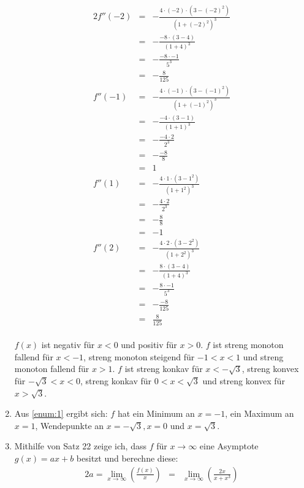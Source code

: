 \documentclass[10pt,a4paper,oneside,ngerman,numbers=noenddot]{scrartcl}
\begin{document}
\begin{enumerate}
	\begin{alignat*}{2}
	f''(-2) &=& -\frac{4 \cdot (-2) \cdot \left(3- (-2)^{2}\right)}{\left(1+ (-2)^{2} \right)^{3}} \\
	&=& -\frac{-8 \cdot \left(3- 4 \right)}{\left(1+ 4 \right)^{3}} \\
	&=& -\frac{-8 \cdot -1}{5^{3}} \\
	&=& -\frac{8}{125} \\
	f''(-1) &=& -\frac{4 \cdot (-1) \cdot \left(3- (-1)^{2}\right)}{\left(1+ (-1)^{2} \right)^{3}} \\
	&=& -\frac{-4 \cdot \left(3- 1\right)}{\left(1+ 1 \right)^{3}} \\
	&=& -\frac{-4 \cdot 2}{2^{3}} \\
	&=& -\frac{-8}{8} \\
	&=& 1 \\
	f''(1) &=& -\frac{4 \cdot 1 \cdot \left(3- 1^{2}\right)}{\left(1+ 1^{2} \right)^{3}} \\
	&=& -\frac{4 \cdot 2}{2^{3}} \\
	&=& -\frac{8}{8} \\
	&=& -1 \\
	f''(2) &=& -\frac{4 \cdot 2 \cdot \left(3- 2^{2}\right)}{\left(1+ 2^{2} \right)^{3}} \\
	&=& -\frac{8 \cdot \left(3- 4\right)}{\left(1+ 4 \right)^{3}} \\
	&=& -\frac{8 \cdot -1}{5^{3}} \\
	&=& -\frac{-8}{125} \\
	&=& \frac{8}{125}
	\end{alignat*}\\
	$f(x)$ ist negativ für $x < 0$ und positiv für $x > 0$. $f$ ist streng monoton fallend für $x < -1$, streng monoton steigend für $-1 < x < 1$ und streng monoton fallend für $x > 1$. $f$ ist streng konkav für $x < -\sqrt{3}$, streng konvex für $- \sqrt{3} < x < 0$, streng konkav für $0 < x < \sqrt{3}$ und streng konvex für $x > \sqrt{3}$.
	\label{enum:1}
	\item Aus \ref{enum:1} ergibt sich: $f$ hat ein Minimum an $x=-1$, ein Maximum an $x=1$, Wendepunkte an $x=-\sqrt{3}, x=0$ und $x=\sqrt{3}$.
	\item Mithilfe von Satz 22 zeige ich, dass $f$ für $x \rightarrow \infty$ eine Asymptote $g(x) =ax +b$ besitzt und berechne diese:\\
	\begin{alignat*}{2}
	a = \lim_{x \rightarrow \infty} \left( \frac{f(x)}{x} \right) &=& \lim_{x \rightarrow \infty} \left(\frac{2x}{x+x^{3}} \right) \\

\end{alignat*}
\end{enumerate}
\end{document}
